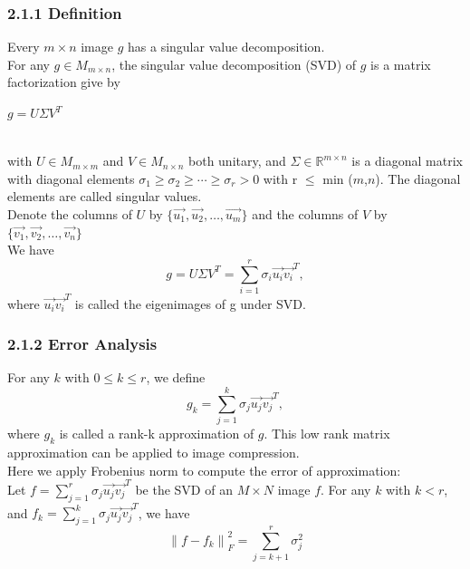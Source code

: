 \documentclass[12pt]{article}
\begin{document}
\subsubsection*{2.1.1 \quad Definition}
Every $m\times n$ image $g$ has a singular value decomposition.\\
For any $g \in M_{m \times n}$, the singular value decomposition (SVD) of $g$ is
 a matrix factorization give by \\
 \centerline{$g = U \Sigma V^T$}\\
 with $U \in M_{m \times m}$ and $V \in M_{n \times n}$ both unitary, and $\Sigma \in 
 \mathbb{R}^{m \times n}$ is a diagonal matrix with diagonal elements 
 $\sigma_1 \geq\sigma_2\geq\cdots\geq\sigma_r > 0$ with r $\leq$ min ($m$,$n$). 
 The diagonal elements are called singular values. \\
Denote the columns of $U$ by $\{\vec{u_1},\vec{u_2},\ldots,\vec{u_m}\}$ and the columns of $V$ by $\{\vec{v_1},\vec{v_2},\ldots,\vec{v_n}\}$\\
We have 
\begin{equation*}
    g = U \Sigma V^T = \sum_{i=1}^{r}\sigma_i \vec{u_i}\vec{v_i}^T,
\end{equation*} 
where $\vec{u_i}\vec{v_i}^T$ is called the eigenimages of g under SVD.

\subsubsection*{2.1.2 \quad Error Analysis}
For any $k$ with $0\leq k \leq r$, we define
\begin{equation*}
    g_k = \sum_{j=1}^{k}\sigma_j \vec{u_j}\vec{v_j}^T,
\end{equation*} 
where $g_k$ is called a rank-k approximation of $g$.
This low rank matrix approximation can be applied to image compression. \\
Here we apply Frobenius norm to compute the error of approximation:\\
Let $f=\sum_{j=1}^{r}\sigma_j \vec{u_j}\vec{v_j}^T$  be the SVD of an $M \times N$ image $f$.
For any $k$ with $k<r$, and $f_k = \sum_{j=1}^{k}\sigma_j \vec{u_j}\vec{v_j}^T$, we have
\begin{equation*}
    {\parallel f-f_k\parallel}_F^2 = \sum_{j=k+1}^{r}\sigma_j^2
\end{equation*}
\end{document}
